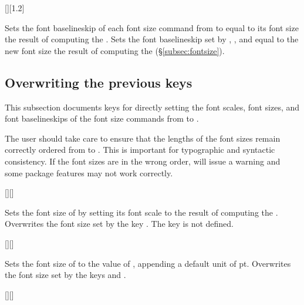 \documentclass{beery}
\begin{document}
\begin{mydisplaycode}
  [][1.2]
\end{mydisplaycode}

Sets the font baselineskip of each font size command from  to  equal to its font size \texttimes{} the result of computing the .
Sets the font baselineskip set by , , and  equal to the new font size \texttimes{} the result of computing the  (\S\ref{subsec:fontsize}).


\subsection{Overwriting the previous keys}
\label{subsec:overwriting}

This subsection documents keys for directly setting the font scales, font sizes, and font baselineskips of the font size commands from  to .

The user should take care to ensure that the lengths of the font sizes remain correctly ordered from  to .
This is important for typographic and syntactic consistency.
If the font sizes are in the wrong order,  will issue a warning and some package features may not work correctly.
\pagebreak%

\begin{mydisplaycode}
  [][]
\end{mydisplaycode}

Sets the font size of  by setting its font scale to the result of computing the .
Overwrites the font size set by the key .
The key  is not defined.

\begin{mydisplaycode}
  [][]
\end{mydisplaycode}

Sets the font size of  to the value of , appending a default unit of \unit{pt}.
Overwrites the font size set by the keys  and .

\begin{mydisplaycode}
  [][]
\end{mydisplaycode}
\end{document}
